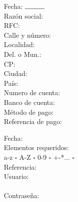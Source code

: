\documentclass{article}
\newlength{\xorig}   \setlength{\xorig}{0cm}
\newlength{\yorig}   \setlength{\yorig}{0cm}
\begin{document}
\linespread{1.6}

\selectfont


\color{gris}



\begin{center}
	\begin{minipage}{0.4675\textwidth}
		Fecha: $\rule{1cm}{0.15mm}$ \\
		Razón social: \\
		RFC: \\
		Calle y número: \\
		Localidad: \\
		Del. o Mun.: \\
		CP: \\
		Ciudad: \\
		País: \\
		Numero de cuenta: \\
		Banco de cuenta: \\
		Método de pago: \\
		Referencia de pago:

	\end{minipage} \hspace{0.5cm}
	\begin{minipage}{0.4675\textwidth}
		Fecha: \\
		Elementos requeridos: \\
		a-z $\square$ \hspace{1.7em} A-Z $\square$ \hspace{1.7em} 0-9 $\square$ \hspace{1.7em} +-*... $\square$ \\
		Referencia: \\
		Usuario: \\ \\
		Contraseña: \\

	\end{minipage}
\end{center}
\end{document}
